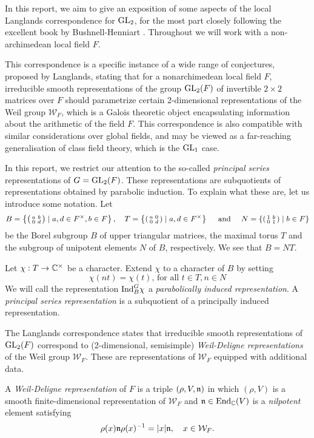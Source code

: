 In this report, we aim to give an exposition of some aspects of the local Langlands correspondence for $\mathrm{GL}_2$, for the most part closely following the excellent book by Bushnell-Henniart \cite{BH1}. Throughout we will work with a non-archimedean local field $F$.

This correspondence is a specific instance of a wide range of conjectures, proposed by Langlands, stating that for a nonarchimedean local field $F$, irreducible smooth representations of the group $\mathrm{GL}_2(F)$ of invertible $2\times 2$ matrices over $F$ should parametrize certain 2-dimensional representations of the Weil group $\mathcal{W}_F$, which is a Galois theoretic object encapsulating information about the arithmetic of the field $F$. This correspondence is also compatible with similar considerations over global fields, and may be viewed as a far-reaching generalisation of class field theory, which is the $\mathrm{GL}_1$ case. 

In this report, we restrict our attention to the so-called \emph{principal series} representations of $G = \mathrm{GL}_2(F)$. These representations are subquotients of representations obtained by parabolic induction. To explain what these are, let us introduce some notation. Let $$B=\left\{\begin{psmallmatrix} a&b\\0&d\end{psmallmatrix} \mid a,d \in F^\times, b \in F\right\},\quad T=\left\{\begin{psmallmatrix}
	a&0\\0&d
\end{psmallmatrix}\mid a,d \in F^\times\right\}\quad\text{ and }\quad N=\left\{\begin{psmallmatrix}
	1&b\\0&1
\end{psmallmatrix}\mid b \in F\right\}$$ be the Borel subgroup $B$ of upper triangular matrices, the maximal torus $T$ and the subgroup of unipotent elements $N$ of $B$, respectively. We see that $B = NT$.
\begin{defn}
	Let $\chi: T\to \mathbb{C}^\times$ be a character. Extend $\chi$ to a character of $B$ by setting
	\[\chi(nt) = \chi(t)\text{, for all } t\in T, n\in N\]
	We will call the representation $\mathrm{Ind}_B^G \chi$ a \emph{parabolically induced representation}. A \emph{principal series representation} is a subquotient of a principally induced representation.
\end{defn}

The Langlands correspondence states that irreducible smooth representations of $\mathrm{GL}_2(F)$ correspond to (2-dimensional, semisimple) \emph{Weil-Deligne representations} of the Weil group $\mathcal{W}_F$. These are representations of $\mathcal{W}_F$ equipped with additional data.
\begin{defn}
	A \emph{Weil-Deligne representation} of $F$ is a triple $(\rho,V,\mathfrak{n})$ in which $(\rho,V)$ is a smooth finite-dimensional representation of $\mathcal{W}_F$ and $\mathfrak{n}\in\mathrm{End}_{\mathbb{C}}(V)$ is a \textit{nilpotent} element satisfying
	$$\rho(x)\mathfrak{n}\rho(x)^{-1}=|x|\mathfrak{n},\quad x\in \mathcal{W}_F.$$
\end{defn}

